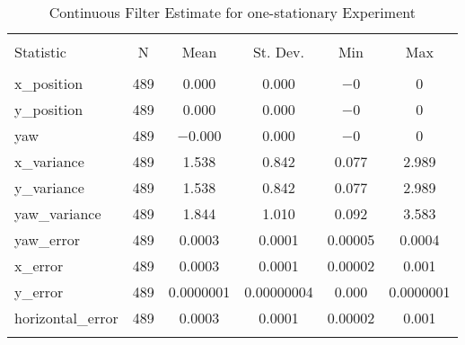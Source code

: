
\begin{table}[h] \centering 
  \caption{Continuous Filter Estimate for one-stationary Experiment} 
  \label{tab:one_stationary_continuous_summary} 
\begin{tabular}{@{\extracolsep{5pt}}lccccc} 
\\[-1.8ex]\hline 
\hline \\[-1.8ex] 
Statistic & \multicolumn{1}{c}{N} & \multicolumn{1}{c}{Mean} & \multicolumn{1}{c}{St. Dev.} & \multicolumn{1}{c}{Min} & \multicolumn{1}{c}{Max} \\ 
\hline \\[-1.8ex] 
x\_position & 489 & 0.000 & 0.000 & $-$0 & 0 \\ 
y\_position & 489 & 0.000 & 0.000 & $-$0 & 0 \\ 
yaw & 489 & $-$0.000 & 0.000 & $-$0 & 0 \\ 
x\_variance & 489 & 1.538 & 0.842 & 0.077 & 2.989 \\ 
y\_variance & 489 & 1.538 & 0.842 & 0.077 & 2.989 \\ 
yaw\_variance & 489 & 1.844 & 1.010 & 0.092 & 3.583 \\ 
yaw\_error & 489 & 0.0003 & 0.0001 & 0.00005 & 0.0004 \\ 
x\_error & 489 & 0.0003 & 0.0001 & 0.00002 & 0.001 \\ 
y\_error & 489 & 0.0000001 & 0.00000004 & 0.000 & 0.0000001 \\ 
horizontal\_error & 489 & 0.0003 & 0.0001 & 0.00002 & 0.001 \\ 
\hline \\[-1.8ex] 
\end{tabular} 
\end{table} 
